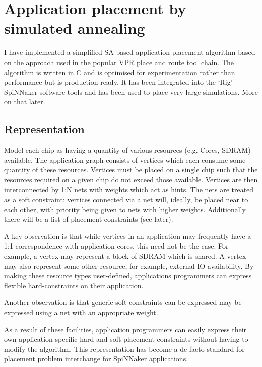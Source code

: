 	\section{Application placement by simulated annealing}
		
		I have implemented a simplified SA based application placement algorithm
		based on the approach used in the popular VPR place and route tool chain.
		The algorithm is written in C and is optimised for experimentation rather
		than performance but is production-ready. It has been integrated into the
		`Rig' SpiNNaker software tools and has been used to place very large
		simulations. More on that later.
		
		\subsection{Representation}
			
			Model each chip as having a quantity of various resources (e.g. Cores,
			SDRAM) available. The application graph consists of vertices which each
			consume some quantity of these resources. Vertices must be placed on a
			single chip such that the resources required on a given chip do not
			exceed those available. Vertices are then interconnected by 1:N nets with
			weights which act as hints. The nets are treated as a soft constraint:
			vertices connected via a net will, ideally, be placed near to each other,
			with priority being given to nets with higher weights. Additionally there
			will be a list of placement constraints (see later).
			
			A key observation is that while vertices in an application may frequently
			have a 1:1 correspondence with application cores, this need-not be the
			case. For example, a vertex may represent a block of SDRAM which is
			shared. A vertex may also represent some other resource, for example,
			external IO availability. By making these resource types user-defined,
			applications programmers can express flexible hard-constraints on their
			application.
			
			Another observation is that generic soft constraints can be expressed may
			be expressed using a net with an appropriate weight.
			
			As a result of these facilities, application programmers can easily
			express their own application-specific hard and soft placement
			constraints without having to modify the algorithm. This representation
			has become a de-facto standard for placement problem interchange for
			SpiNNaker applications.
		
